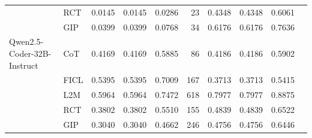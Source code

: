 \documentclass[conference]{IEEEtran}
\begin{document}
\begin{longtable}{p{3.5cm} l r r r r r r r r}
                    & RCT  & 0.0145 & 0.0145 & 0.0286 & 23 & 0.4348 & 0.4348 & 0.6061 \\
                    & GIP  & 0.0399 & 0.0399 & 0.0768 & 34 & 0.6176 & 0.6176 & 0.7636 \\ \addlinespace
Qwen2.5-Coder-32B-Instruct & CoT  & 0.4169 & 0.4169 & 0.5885 & 86 & 0.4186 & 0.4186 & 0.5902 \\
                           & FICL & 0.5395 & 0.5395 & 0.7009 & 167 & 0.3713 & 0.3713 & 0.5415 \\
                           & L2M  & 0.5964 & 0.5964 & 0.7472 & 618 & 0.7977 & 0.7977 & 0.8875 \\
                           & RCT  & 0.3802 & 0.3802 & 0.5510 & 155 & 0.4839 & 0.4839 & 0.6522 \\
                           & GIP  & 0.3040 & 0.3040 & 0.4662 & 246 & 0.4756 & 0.4756 & 0.6446 \\

  \bottomrule

\end{longtable}
\end{document}
